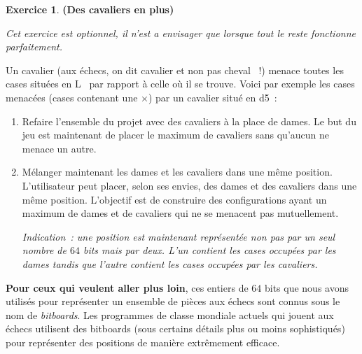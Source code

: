 \documentclass[12pt]{article}
\theoremstyle{definition}
\newtheorem{Exercice}{Exercice}
\begin{document}
\begin{Exercice}{\bf (Des cavaliers en plus)}\smallskip

{\em Cet exercice est optionnel, il n'est a envisager que lorsque
tout le reste fonctionne parfaitement.}
\smallskip

Un cavalier (aux échecs, on dit \og cavalier \fg{} et non pas
\og cheval \fg{}~!) menace toutes les cases situées \og en L \fg\,
par rapport à celle où il se trouve. Voici par exemple les cases
menacées (cases contenant une $\times$) par un cavalier situé
en d5~:
\begin{center}\showboard\end{center}

\begin{enumerate}
    \item Refaire l'ensemble du projet avec des cavaliers à la place
    de dames. Le but du jeu est maintenant de placer le maximum de
    cavaliers sans qu'aucun ne menace un autre.
    \smallskip

    \item Mélanger maintenant les dames et les cavaliers dans une même
    position. L'utilisateur peut placer, selon ses envies, des dames
    et des cavaliers dans une même position. L'objectif est de
    construire des configurations ayant un maximum de dames et de
    cavaliers qui ne se menacent pas mutuellement.
    \smallskip

    {\it Indication~: une position est maintenant représentée non
    pas par un seul nombre de $64$ bits mais par deux. L'un contient
    les cases occupées par les dames tandis que l'autre contient
    les cases occupées par les cavaliers.}
\end{enumerate}
\end{Exercice}
\bigskip

{\bf Pour ceux qui veulent aller plus loin}, ces entiers de $64$ bits
que nous avons utilisés pour représenter un ensemble de pièces aux échecs
sont connus sous le nom de {\em bitboards}. Les programmes de classe
mondiale actuels qui jouent aux échecs utilisent des bitboards (sous
certains détails plus ou moins sophistiqués) pour représenter des
positions de manière extrêmement efficace.
\end{document}

